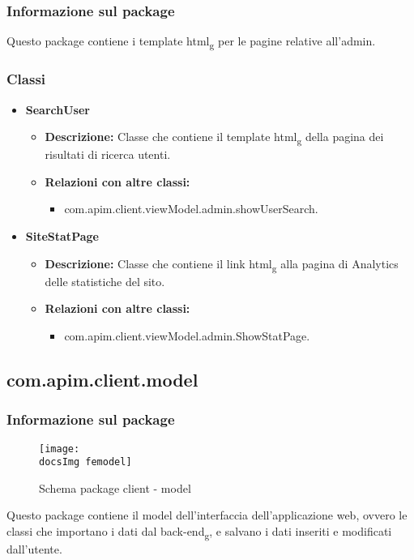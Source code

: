 {{		\subsubsection{Informazione sul package}{
			Questo package contiene i template html\textsubscript{g} per le pagine relative all'admin.
		}
		\subsubsection{Classi}{
			\begin{itemize}
				\item \textbf{SearchUser}
					\begin{itemize}
						\item \textbf{Descrizione:} Classe che contiene il template html\textsubscript{g} della pagina dei risultati di ricerca utenti.
						\item \textbf{Relazioni con altre classi:}
						\begin{itemize}
							\item com.apim.client.viewModel.admin.showUserSearch.
						\end{itemize}
					\end{itemize}
				\item \textbf{SiteStatPage}
					\begin{itemize}
						\item \textbf{Descrizione:} Classe che contiene il link html\textsubscript{g} alla pagina di Analytics delle statistiche del sito.
						\item \textbf{Relazioni con altre classi:}
						\begin{itemize}
							\item com.apim.client.viewModel.admin.ShowStatPage.
						\end{itemize}
					\end{itemize}	
			\end{itemize}
		}
	}
	\subsection{com.apim.client.model}{
		\subsubsection{Informazione sul package}{
			\begin{figure}[ht]
				\centering
				\texttt{[image: \\docsImg femodel]}
				\caption{Schema package client - model}
			\end{figure}
		Questo package contiene il model dell'interfaccia dell'applicazione web, ovvero le classi che importano i dati dal back-end\textsubscript{g}, e salvano i dati inseriti e modificati dall'utente.
		}
}}
